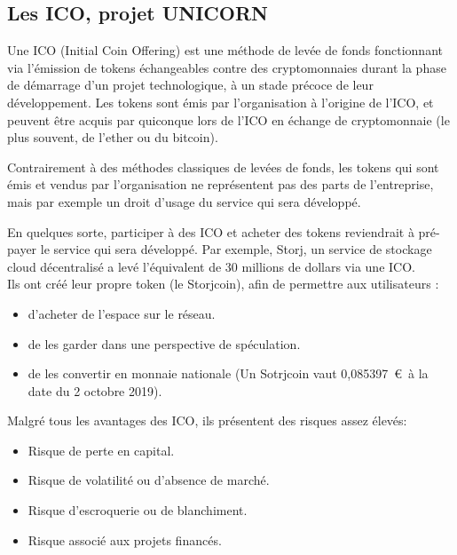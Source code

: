 \documentclass[12pt, a4paper, oneside]{book}
\begin{document}
    \subsection{Les ICO, projet UNICORN}

    Une ICO (Initial Coin Offering) est une méthode de levée de fonds fonctionnant via l’émission de tokens échangeables contre des cryptomonnaies 
    durant la phase de démarrage d’un projet technologique, à un stade précoce de leur développement.
    Les tokens sont émis par l’organisation à l’origine de l’ICO, et peuvent être acquis par quiconque lors de l’ICO en échange de cryptomonnaie 
    (le plus souvent, de l’ether ou du bitcoin).

    Contrairement à des méthodes classiques de levées de fonds, les tokens qui sont émis et vendus par l'organisation ne représentent pas des parts
    de l'entreprise, mais par exemple un droit d'usage du service qui sera développé.

    En quelques sorte, participer à des ICO et acheter des tokens reviendrait à pré-payer le service qui sera développé.
    Par exemple, Storj, un service de stockage cloud décentralisé a levé l'équivalent de 30 millions de dollars via une ICO.
    \\
    Ils ont créé leur propre token (le Storjcoin), afin de permettre aux utilisateurs :
    
    \begin{itemize}
        \item d'acheter de l'espace sur le réseau.
        \item de les garder dans 
        une perspective de spéculation.
        \item de les convertir en monnaie nationale (Un Sotrjcoin vaut 0,085397~\euro~à la date du 2 octobre 2019).
        \\
    \end{itemize}
    
    \noindent
    Malgré tous les avantages des ICO, ils présentent des risques assez élevés:
    \begin{itemize}
        \item Risque de perte en capital.
        \item Risque de volatilité ou d'absence de marché.
        \item Risque d'escroquerie ou de blanchiment.
        \item Risque associé aux projets financés.
        \\\\
    \end{itemize}
\end{document}

